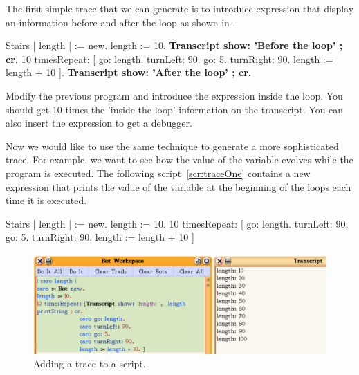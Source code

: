 The first simple trace that we can generate is to introduce expression that display an information before and after the loop as shown in .

\begin{scriptwithtitle}{Stairs}\label{src:strangestairhere2}
| \caro length |
\caro := \Turtle new.
length := 10.
\textbf{Transcript show: 'Before the loop' ; cr.}
10 timesRepeat: 
                [ \caro go: length.
                \caro turnLeft: 90.
                \caro go: 5.
                \caro turnRight: 90.
                length := length + 10 ].
\textbf{Transcript show: 'After the loop' ; cr.}
\end{scriptwithtitle}

Modify the previous program and introduce the expression  inside the loop. You should get 10 times the 'inside the loop' information on the transcript.  You can also insert the expression  to get a debugger.



Now we would like to  use the same technique to generate a more sophisticated trace. For example, we want to see how the value of the variable  evolves while the program is executed. The following script~\ref{scr:traceOne} contains a new expression that prints the value of the variable  at the beginning of the loops each time it is  executed.

\begin{scriptwithtitle}{Stairs}\label{src:strangestairtrace}\label{scr:traceOne}
| \caro length |
\caro := \Turtle new.
length := 10.
10 timesRepeat: 
                [ 
                \caro go: length.
                \caro turnLeft: 90.
                \caro go: 5.
                \caro turnRight: 90.
                length := length + 10 ]
\end{scriptwithtitle}


\begin{figure}
\begin{center}
\includegraphics[width=\linewidth]{Stairs}
\caption{Adding a trace to a script. }
\end{center}
\end{figure}


